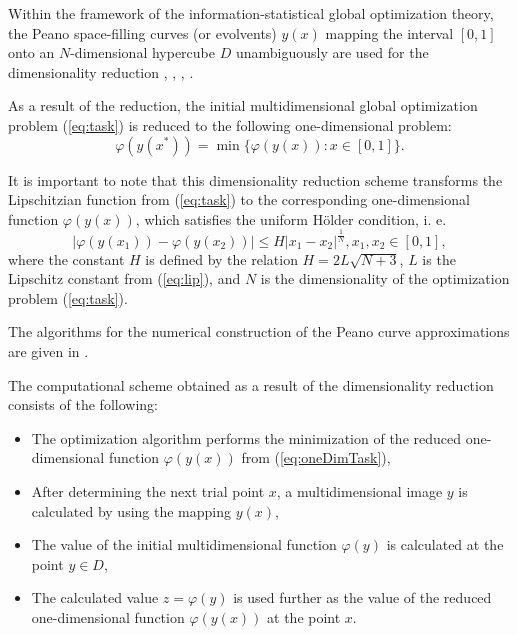 \documentclass[runningheads]{llncs}
\begin{document}
Within the framework of the information-statistical global optimization theory,
the Peano space-filling curves (or evolvents) \(y(x)\) mapping the interval \([0,1]\)
onto an \(N\)-dimensional hypercube \(D\) unambiguously are used for the dimensionality
reduction \cite{sergeyevStronginLera2013}, \cite{strongin1978},
\cite{stronginGergelBarkalovParGO}, \cite{strSergGO}.
\par
As a result of the reduction, the initial multidimensional global optimization
problem (\ref{eq:task}) is reduced to the following one-dimensional problem:
\begin{equation}
\label{eq:oneDimTask}
\varphi(y(x^*))=\min\{\varphi(y(x)):x\in [0,1]\}.
\end{equation}
\par
It is important to note that this dimensionality reduction scheme transforms the %
Lipschitzian function from (\ref{eq:task}) to the corresponding one-dimensional
function \(\varphi(y(x))\), which satisfies the uniform H{\"o}lder condition, i. e.
\begin{equation}
\label{eq:holder}
|\varphi(y(x_1))-\varphi(y(x_2))|\leq H{|x_1-x_2|}^{\frac{1}{N}}, x_1,x_2\in[0,1],
\end{equation}
where the constant $H$ is defined by the relation \(H=2L\sqrt{N+3}\), \(L\) is the Lipschitz
constant from (\ref{eq:lip}), and \(N\) is the dimensionality of the optimization problem
(\ref{eq:task}).
\par
The algorithms for the numerical construction of the Peano curve approximations are
given in \cite{strSergGO}.

\par
The computational scheme obtained as a result of the dimensionality reduction consists of the
following:
\begin{itemize}
  \item The optimization algorithm performs the minimization of the reduced one-dimensional
  function \(\varphi(y(x))\) from (\ref{eq:oneDimTask}),
  \item After determining the next trial point \(x\), a multidimensional image \(y\) is calculated by
using the mapping \(y(x)\),
  \item The value of the initial multidimensional function \(\varphi(y)\) is calculated at the point
\(y\in D\),
  \item The calculated value \(z=\varphi(y)\) is used further as the value of the reduced one-dimensional function \(\varphi(y(x))\) at the point \(x\).
\end{itemize}
\end{document}
